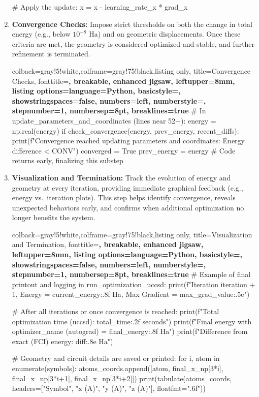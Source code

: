 \begin{enumerate}
\begin{tcblisting}
# Apply the update:
x = x - learning_rate_x * grad_x
    \end{tcblisting}

    \item \textbf{Convergence Checks:}
    Impose strict thresholds on both the change in total energy (e.g., below \(10^{-8}\) Ha) and on geometric displacements. Once these criteria are met, the geometry is considered optimized and stable, and further refinement is terminated.
    \begin{tcblisting}{colback=gray!5!white,colframe=gray!75!black,listing only,
        title=Convergence Checks, fonttitle=\bfseries, breakable, enhanced jigsaw, leftupper=8mm,
        listing options={language=Python, basicstyle=\ttfamily\small,
        showstringspaces=false, numbers=left, numberstyle=\footnotesize,
        stepnumber=1, numbersep=8pt, breaklines=true}}
# In update_parameters_and_coordinates (lines near 52+):
energy = np.real(energy)
if check_convergence(energy, prev_energy, recent_diffs):
    print(f"Convergence reached updating parameters and coordinates: Energy difference < {CONV}")
    converged = True
    prev_energy = energy
    # Code returns early, finalizing this substep

    \end{tcblisting}

    \item \textbf{Visualization and Termination:}
    Track the evolution of energy and geometry at every iteration, providing immediate graphical feedback (e.g., energy vs.\ iteration plots). This step helps identify convergence, reveals unexpected behaviors early, and confirms when additional optimization no longer benefits the system.
    \begin{tcblisting}{colback=gray!5!white,colframe=gray!75!black,listing only,
        title=Visualization and Termination, fonttitle=\bfseries, breakable, enhanced jigsaw, leftupper=8mm,
        listing options={language=Python, basicstyle=\ttfamily\small,
        showstringspaces=false, numbers=left, numberstyle=\footnotesize,
        stepnumber=1, numbersep=8pt, breaklines=true}}
# Example of final printout and logging in run_optimization_uccsd:
print(f"Iteration {iteration + 1}, Energy = {current_energy:.8f} Ha, Max Gradient = {max_grad_value:.5e}")

# After all iterations or once convergence is reached:
print(f"Total optimization time (uccsd): {total_time:.2f} seconds")
print(f"Final energy with {optimizer_name} (autograd) = {final_energy:.8f} Ha")
print(f"Difference from exact (FCI) energy: {diff:.8e} Ha")

# Geometry and circuit details are saved or printed:
for i, atom in enumerate(symbols):
    atoms_coords.append([atom, final_x_np[3*i], final_x_np[3*i+1], final_x_np[3*i+2]])
print(tabulate(atoms_coords, headers=["Symbol", "x (A)", "y (A)", "z (A)"], floatfmt=".6f"))
    \end{tcblisting}
\end{enumerate}


